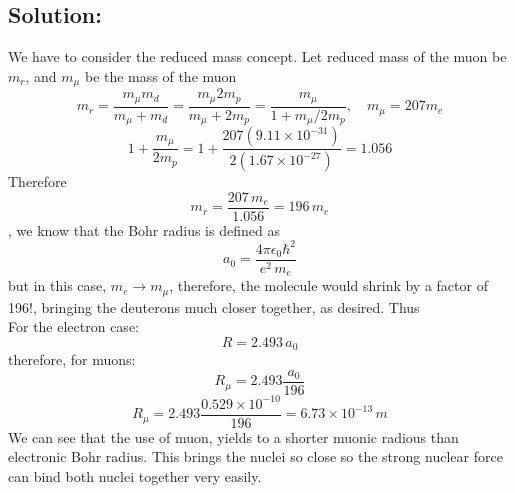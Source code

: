 \documentclass[12 pt]{article}
\numberwithin{equation}{section}
\begin{document}
\subsection*{Solution:}
We have to consider the reduced mass concept. Let reduced mass of the muon be $m_r$, and $m_\mu$
be the mass of the muon
\begin{equation}
  m_r = \frac{m_\mu m_d}{m_\mu+m_d} = \frac{m_\mu 2m_p}{m_\mu+2m_p} = \frac{m_\mu}
  {1 + m_\mu/2m_p}, \quad m_\mu = 207 m_e
\end{equation}
\[
  1+\frac{m_\mu}{2m_p} = 1 + \frac{207(9.11\times 10^{-31})}{2(1.67\times 10^{-27})} = 1.056
\]
Therefore 
\begin{equation}
  m_r = \frac{207\,m_e}{1.056} = 196\,m_e
\end{equation}
, we know that the Bohr radius is defined as 
\[
  a_0 = \frac{4\pi\epsilon_0\hbar^2}{e^2\,m_e} 
\]
but in this case, $m_e \rightarrow m_\mu$, therefore, the molecule would shrink by a factor 
of 196!, bringing the deuterons much closer together, as desired. Thus\\
For the electron case: 
\[
R = 2.493\,a_0
\]
therefore, for muons:
\[
  R_\mu = 2.493 \frac{a_0}{196}
\]
\[
  \boxed{R_\mu = 2.493\frac{0.529\times 10^{-10}}{196} = 6.73\times 10^{-13}\,m}
\]
We can see that the use of muon, yields to a shorter muonic radious than electronic Bohr
radius. This brings the nuclei so close so the strong nuclear force can bind both nuclei 
together very easily.
\end{document}
